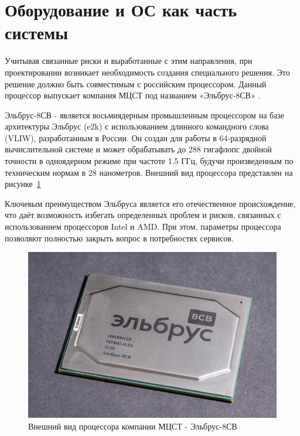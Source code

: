 \section{Оборудование и ОС как часть системы}

Учитывая связанные риски и выработанные с этим направления, при проектировании возникает необходимость создания специального решения. Это решение должно быть совместимым с российским процессором. Данный процессор выпускает компания МЦСТ под названием «Эльбрус-8СВ» \cite{dev:elbrus_cpu}. 

Эльбрус-8СВ - является восьмиядерным промышленным процессором на базе архитектуры Эльбрус (e2k) с использованием длинного командного слова (VLIW), разработанным в России. Он создан для работы в 64-разрядной вычислительной системе и может обрабатывать до 288 гигафлопс двойной точности в одноядерном режиме при частоте 1.5 ГГц, будучи произведенным по техническим нормам в 28 нанометров. Внешний вид процессора представлен на рисунке~\ref{fig:elbrus} 



Ключевым преимуществом Эльбруса является его отечественное происхождение, что даёт возможность избегать определенных проблем и рисков, связанных с использованием процессоров Intel и AMD. При этом, параметры процессора позволяют полностью закрыть вопрос в потребностях сервисов.

\begin{figure}
  \centering
  \includegraphics[width=.6\textwidth]{graphics/img/elbrus}
  \caption{Внешний вид процессора компании МЦСТ - Эльбрус-8СВ}
  \label{fig:elbrus}
\end{figure}

